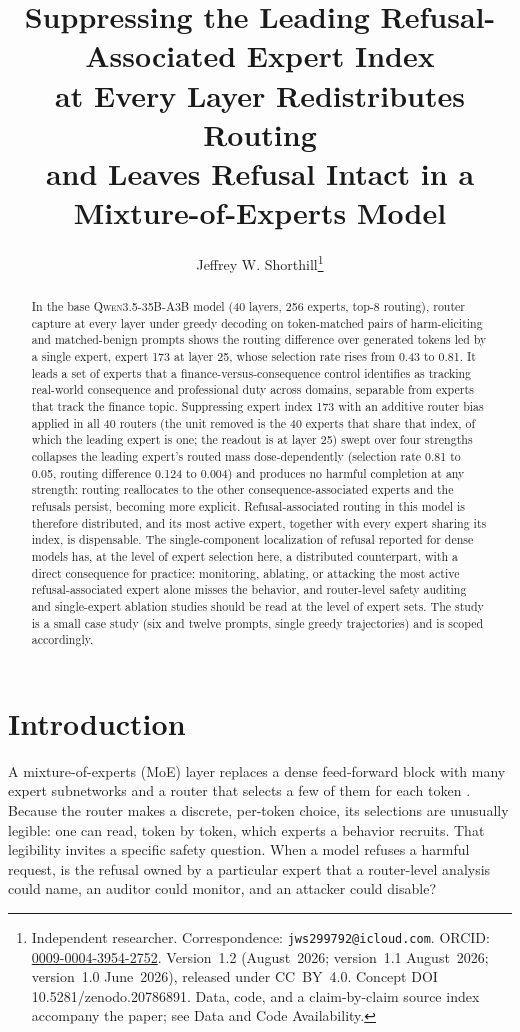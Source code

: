 \documentclass[10pt,twocolumn]{article}
\title{\textbf{Suppressing the Leading Refusal-Associated Expert Index\\
at Every Layer Redistributes Routing\\
and Leaves Refusal Intact in a Mixture-of-Experts Model}}
\author{Jeffrey W. Shorthill\thanks{Independent researcher. Correspondence:
\texttt{jws299792@icloud.com}. ORCID: \href{https://orcid.org/0009-0004-3954-2752}{0009-0004-3954-2752}.
Version~1.2 (August~2026; version~1.1 August~2026; version~1.0 June~2026), released under CC~BY~4.0. Concept
DOI 10.5281/zenodo.20786891. Data, code, and a claim-by-claim source index accompany
the paper; see Data and Code Availability.}}
\date{}
\begin{document}
\maketitle

\begin{abstract}
In the base \textsc{Qwen3.5-35B-A3B} model (40 layers, 256 experts, top-8
routing), router capture at every layer under greedy decoding on
token-matched pairs of harm-eliciting and matched-benign prompts shows the
routing difference over generated tokens led by a single expert, expert 173
at layer 25, whose selection rate rises from 0.43 to 0.81. It leads a set of
experts that a finance-versus-consequence control identifies as tracking
real-world consequence and professional duty across domains, separable from
experts that track the finance topic. Suppressing expert index 173 with an
additive router bias applied in all 40 routers (the unit removed is the 40
experts that share that index, of which the leading expert is one; the
readout is at layer 25) swept over four strengths collapses the leading
expert's routed mass dose-dependently (selection rate 0.81 to 0.05, routing
difference 0.124 to 0.004) and produces no harmful completion at any
strength: routing reallocates to the other consequence-associated experts and
the refusals persist, becoming more explicit. Refusal-associated routing in
this model is therefore distributed, and its most active expert, together
with every expert sharing its index, is dispensable. The
single-component localization of refusal reported for dense models has, at
the level of expert selection here, a distributed counterpart, with a direct
consequence for practice: monitoring, ablating, or attacking the most active
refusal-associated expert alone misses the behavior, and router-level safety
auditing and single-expert ablation studies should be read at the level of
expert sets. The study is a small case study (six and twelve prompts, single
greedy trajectories) and is scoped accordingly.
\end{abstract}

\section{Introduction}
\label{sec:intro}

A mixture-of-experts (MoE) layer replaces a dense feed-forward block with many
expert subnetworks and a router that selects a few of them for each token
\citep{shazeer2017outrageously,fedus2022switch}. Because the router makes a
discrete, per-token choice, its selections are unusually legible: one can read,
token by token, which experts a behavior recruits. That legibility invites a
specific safety question. When a model refuses a harmful request, is the
refusal owned by a particular expert that a router-level analysis could name,
an auditor could monitor, and an attacker could disable?
\end{document}
